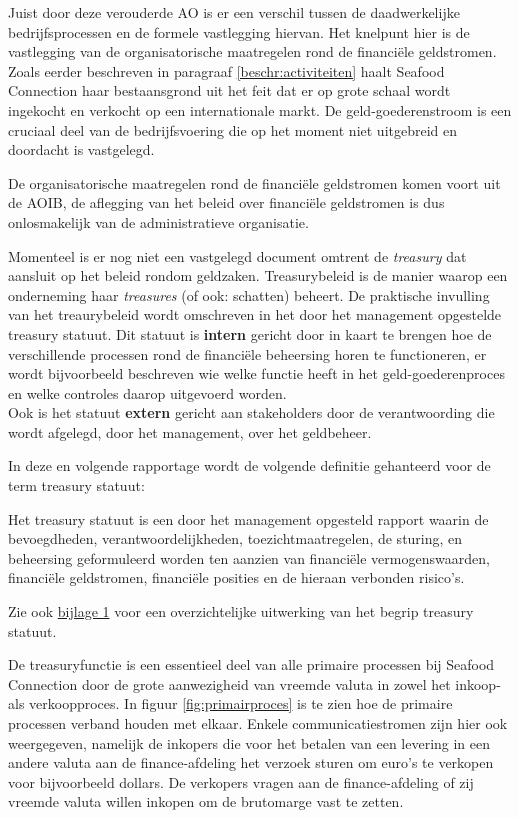 \documentclass[10pt,a4paper,twoside]{report}
\newcounter{bijlage}[section] %
\begin{document}
Juist door deze verouderde AO is er een verschil tussen de daadwerkelijke bedrijfsprocessen en de formele vastlegging hiervan. Het knelpunt hier is de vastlegging van de organisatorische maatregelen rond de financiële geldstromen. Zoals eerder beschreven in paragraaf \ref{beschr:activiteiten} haalt Seafood Connection haar bestaansgrond uit het feit dat er op grote schaal wordt ingekocht en verkocht op een internationale markt. De geld-goederenstroom is een cruciaal deel van de bedrijfsvoering die op het moment niet uitgebreid en doordacht is vastgelegd. \citep{aoibsfc}

De organisatorische maatregelen rond de financiële geldstromen komen voort uit de AOIB, de aflegging van het beleid over financiële geldstromen is dus onlosmakelijk van de administratieve organisatie. 

\newpage
Momenteel is er nog niet een vastgelegd document omtrent de \textit{treasury} dat aansluit op het beleid rondom geldzaken. Treasurybeleid is de manier waarop een onderneming haar \textit{treasures} (of ook: schatten) beheert. De praktische invulling van het treaurybeleid wordt omschreven in het door het management opgestelde treasury statuut. 
Dit statuut is \textbf{intern} gericht door in kaart te brengen hoe de verschillende processen rond de financiële beheersing horen te functioneren, er wordt bijvoorbeeld beschreven wie welke functie heeft in het geld-goederenproces en welke controles daarop uitgevoerd worden. \\
Ook is het statuut \textbf{extern} gericht aan stakeholders door de verantwoording die wordt afgelegd, door het management, over het geldbeheer. \citep{jans}

In deze en volgende rapportage wordt de volgende definitie gehanteerd voor de term treasury statuut: 

\begin{displayquote}
Het treasury statuut is een door het management opgesteld rapport waarin de bevoegdheden, verantwoordelijkheden, toezichtmaatregelen, de sturing, en beheersing geformuleerd worden ten aanzien van financiële vermogenswaarden, financiële geldstromen, financiële posities en de hieraan verbonden risico’s. \\
\citep{jans,buunk} \label{def:treasury}
\end{displayquote}
\noindent
Zie ook \hyperlink{bij:treasury}{bijlage 1} voor een overzichtelijke uitwerking van het begrip treasury statuut.

\bigskip
De treasuryfunctie is een essentieel deel van alle primaire processen bij Seafood Connection door de grote aanwezigheid van vreemde valuta in zowel het inkoop- als verkoopproces. In figuur \ref{fig:primairproces} is te zien hoe de primaire processen verband houden met elkaar. Enkele communicatiestromen zijn hier ook weergegeven, namelijk de inkopers die voor het betalen van een levering in een andere valuta aan de finance-afdeling het verzoek sturen om euro's te verkopen voor bijvoorbeeld dollars. De verkopers vragen aan de finance-afdeling of zij vreemde valuta willen inkopen om de brutomarge vast te zetten.
\end{document}
